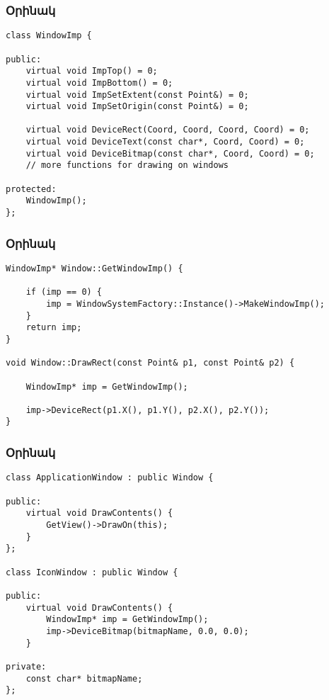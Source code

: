 \documentclass{beamer}
\begin{document}
\begin{frame}[fragile]\frametitle{Օրինակ}
\begin{english}
\begin{verbatim}
class WindowImp {

public:
    virtual void ImpTop() = 0;
    virtual void ImpBottom() = 0;
    virtual void ImpSetExtent(const Point&) = 0;
    virtual void ImpSetOrigin(const Point&) = 0;

    virtual void DeviceRect(Coord, Coord, Coord, Coord) = 0;
    virtual void DeviceText(const char*, Coord, Coord) = 0;
    virtual void DeviceBitmap(const char*, Coord, Coord) = 0;
    // more functions for drawing on windows

protected:
    WindowImp();
};
\end{verbatim}
\end{english}
\end{frame}

\begin{frame}[fragile]\frametitle{Օրինակ}
\begin{english}
\begin{verbatim}
WindowImp* Window::GetWindowImp() {

    if (imp == 0) {
        imp = WindowSystemFactory::Instance()->MakeWindowImp();
    }
    return imp;
}

void Window::DrawRect(const Point& p1, const Point& p2) {

    WindowImp* imp = GetWindowImp();

    imp->DeviceRect(p1.X(), p1.Y(), p2.X(), p2.Y());
}
\end{verbatim}
\end{english}
\end{frame}

\begin{frame}[fragile]\frametitle{Օրինակ}
\begin{english}
\begin{verbatim}
class ApplicationWindow : public Window {

public:
    virtual void DrawContents() {
        GetView()->DrawOn(this);
    }
};

class IconWindow : public Window {

public:
    virtual void DrawContents() {
        WindowImp* imp = GetWindowImp();
        imp->DeviceBitmap(bitmapName, 0.0, 0.0);
    }

private:
    const char* bitmapName;
};
\end{verbatim}
\end{english}
\end{frame}
\end{document}
